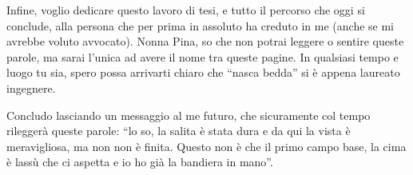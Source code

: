 Infine, voglio dedicare questo lavoro di tesi, e tutto il percorso che oggi si conclude, alla persona che per prima in assoluto ha creduto in me (anche se mi avrebbe voluto avvocato). Nonna Pina, so che non potrai leggere o sentire queste parole, ma sarai l'unica ad avere il nome tra queste pagine. In qualsiasi tempo e luogo tu sia, spero possa arrivarti chiaro che ``nasca bedda'' si è appena laureato ingegnere.

Concludo lasciando un messaggio al me futuro, che sicuramente col tempo rileggerà queste parole: ``lo so, la salita è stata dura e da qui la vista è meravigliosa, ma non non è finita. Questo non è che il primo campo base, la cima è lassù che ci aspetta e io ho già la bandiera in mano''.
